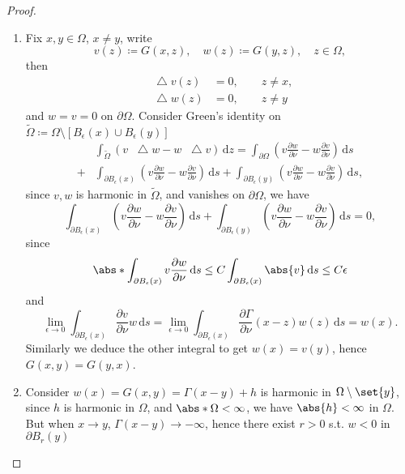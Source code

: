 \documentclass[a4paper]{article}
\newcommand*\Laplace{\mathop{}\!\mathbin\bigtriangleup}
\newcommand\diff{\,\mathrm{d}}
\DeclarePairedDelimiter{\set}\lbrace\rbrace
\DeclarePairedDelimiter{\abs}\lvert\rvert
\begin{document}
\begin{proof}
\begin{enumerate}
\item Fix $x,y \in \Omega$, $x \neq y$, write
\begin{equation*}
v(z) \coloneqq G(x, z), \quad w(z) \coloneqq G(y, z), \quad z \in \Omega,
\end{equation*}
then
\begin{align*}
\Laplace v(z) &= 0, \qquad z \neq x, \\
\Laplace w(z) &= 0, \qquad z \neq y
\end{align*}
and $w = v = 0$ on $\partial\Omega$.
Consider Green's identity on $\tilde{\Omega} \coloneqq \Omega\setminus[B_{\epsilon}(x)\cup B_{\epsilon}(y)]$
\begin{align*}
& \int_{\tilde{\Omega}} (v\Laplace w - w\Laplace v) \diff z
= \int_{\partial\Omega} \left(v\frac{\partial w}{\partial\nu} - w\frac{\partial v}{\partial\nu}\right)\diff s \\
+{} & \int_{\partial B_{\epsilon}(x)} \left(v\frac{\partial w}{\partial\nu} - w\frac{\partial v}{\partial\nu}\right)\diff s
+ \int_{\partial B_{\epsilon}(y)} \left(v\frac{\partial w}{\partial\nu} - w\frac{\partial v}{\partial\nu}\right)\diff s,
\end{align*}
since $v, w$ is harmonic in $\tilde{\Omega}$, and vanishes on $\partial\Omega$, we have
\begin{equation*}
\int_{\partial B_{\epsilon}(x)} \left(v\frac{\partial w}{\partial\nu} - w\frac{\partial v}{\partial\nu}\right)\diff s
+ \int_{\partial B_{\epsilon}(y)} \left(v\frac{\partial w}{\partial\nu} - w\frac{\partial v}{\partial\nu}\right)\diff s = 0,
\end{equation*}
since
\begin{equation*}
\abs*{\int_{\partial B_{\epsilon}(x)} v\frac{\partial w}{\partial\nu}\diff s}
\leq C\int_{\partial B_{\epsilon}(x)}\abs{v}\diff s \leq C\epsilon
\end{equation*}
and
\begin{equation*}
\lim_{\epsilon \to 0} \int_{\partial B_{\epsilon}(x)}\frac{\partial v}{\partial\nu}w\diff s
= \lim_{\epsilon \to 0} \int_{\partial B_{\epsilon}(x)}\frac{\partial\Gamma}{\partial\nu}(x-z)w(z)\diff s = w(x).
\end{equation*}
Similarly we deduce the other integral to get $w(x) = v(y)$, hence $G(x,y) = G(y,x)$.
\item Consider $w(x) = G(x,y) = \Gamma(x-y) + h$ is harmonic in $\Omega\setminus\set{y}$, since $h$ is harmonic in $\Omega$,
and $\abs*{\Omega} < \infty$, we have $\abs{h} < \infty$ in $\Omega$. But when $x \to y$, $\Gamma(x-y) \to -\infty$,
hence there exist $r > 0$ s.t. $w<0$ in $\partial B_r(y)$


\end{enumerate}
\end{proof}
\end{document}
